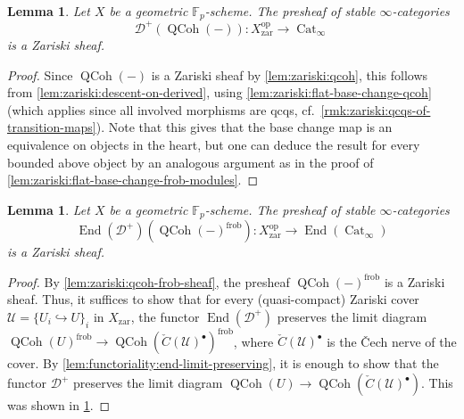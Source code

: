 \documentclass{article}
\theoremstyle{definition}
\theoremstyle{definition}
\theoremstyle{definition}
\theoremstyle{plain}
\newtheorem{lem}[defn]{Lemma}
\theoremstyle{plain}
\theoremstyle{plain}
\theoremstyle{plain}
\theoremstyle{plain}
\theoremstyle{plain}
\theoremstyle{plain}
\theoremstyle{plain}
\theoremstyle{remark}
\theoremstyle{remark}
\theoremstyle{plain}
\theoremstyle{plain}
\theoremstyle{plain}
\theoremstyle{plain}
\theoremstyle{plain}
\newcommand{\Fp}{\mathbb{F}_p}
\newcommand{\op}[1]{#1^{\operatorname{op}}}
\newcommand{\QCoh}[1]{\operatorname{QCoh}(#1)}
\newcommand{\End}[1]{\operatorname{End}(#1)}
\newcommand{\Cat}[1]{\mathcal{#1}}
\newcommand{\CatInf}{\operatorname{Cat}_{\infty}}
\newcommand{\zar}{\operatorname{zar}}
\newcommand{\frob}{\operatorname{frob}}
\begin{document}
\begin{lem} \label{lem:zariski:left-sep-derived-category-qcoh-sheaf}
    Let $X$ be a geometric $\Fp$-scheme.
    The presheaf of stable $\infty$-categories
    \begin{equation*}
        \Cat D^+(\QCoh{-}) \colon \op{X}_{\zar} \to \CatInf
    \end{equation*}
    is a Zariski sheaf.
\end{lem}
\begin{proof}
    Since $\QCoh{-}$ is a Zariski sheaf by \cref{lem:zariski:qcoh},
    this follows from \cref{lem:zariski:descent-on-derived},
    using \cref{lem:zariski:flat-base-change-qcoh}
    (which applies 
    since all involved morphisms are qcqs, cf.\ \cref{rmk:zariski:qcqs-of-transition-maps}).
    Note that this gives that the base change map is an equivalence on objects in the heart,
    but one can deduce the result for every bounded above object by an analogous argument 
    as in the proof of \cref{lem:zariski:flat-base-change-frob-modules}.
\end{proof}

\begin{lem} \label{lem:zariski:end-left-sep-derived-category-sheaf}
    Let $X$ be a geometric $\Fp$-scheme.
    The presheaf of stable $\infty$-categories
    \begin{equation*}
        \End{\Cat D^+}(\QCoh{-}^{\frob}) \colon \op{X}_{\zar} \to \End{\CatInf}
    \end{equation*}
    is a Zariski sheaf.
\end{lem}

\begin{proof}
    By \cref{lem:zariski:qcoh-frob-sheaf}, the presheaf $\QCoh{-}^{\frob}$ is a Zariski sheaf.
    Thus, it suffices to show that for every (quasi-compact) Zariski cover $\Cat U = \{U_i \hookrightarrow U\}_i$ in $X_{\zar}$, the functor 
    $\End{\Cat D^+}$ preserves the limit diagram $\QCoh{U}^{\frob} \to \QCoh{\check{C}(\Cat U)^\bullet}^{\frob}$,
    where $\check{C}(\Cat U)^\bullet$ is the \v{C}ech nerve of the cover.
    By \cref{lem:functoriality:end-limit-preserving}, it is enough to show that the functor $\Cat D^+$ preserves the limit diagram $\QCoh{U} \to \QCoh{\check{C}(\Cat U)^\bullet}$.
    This was shown in \cref{lem:zariski:left-sep-derived-category-qcoh-sheaf}.
\end{proof}
\end{document}

